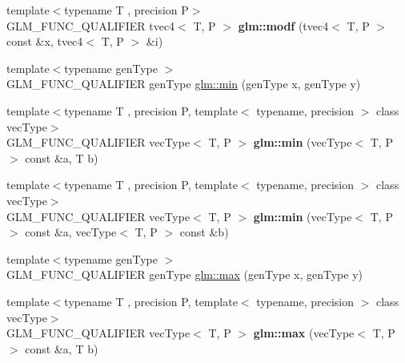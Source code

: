 \begin{DoxyCompactItemize}
\item 
\hypertarget{namespaceglm_ab562559172a505edca9444da652387dd}{{\footnotesize template$<$typename T , precision P$>$ }\\G\-L\-M\-\_\-\-F\-U\-N\-C\-\_\-\-Q\-U\-A\-L\-I\-F\-I\-E\-R tvec4$<$ T, P $>$ {\bfseries glm\-::modf} (tvec4$<$ T, P $>$ const \&x, tvec4$<$ T, P $>$ \&i)}\label{namespaceglm_ab562559172a505edca9444da652387dd}

\item 
{\footnotesize template$<$typename gen\-Type $>$ }\\G\-L\-M\-\_\-\-F\-U\-N\-C\-\_\-\-Q\-U\-A\-L\-I\-F\-I\-E\-R gen\-Type \hyperlink{group__core__func__common_ga2c2bde1cec025b7ddff83c74a1113719}{glm\-::min} (gen\-Type x, gen\-Type y)
\item 
\hypertarget{group__core__func__common_ga33e66cacf3e991ef1f7d0fce6d073ff9}{{\footnotesize template$<$typename T , precision P, template$<$ typename, precision $>$ class vec\-Type$>$ }\\G\-L\-M\-\_\-\-F\-U\-N\-C\-\_\-\-Q\-U\-A\-L\-I\-F\-I\-E\-R vec\-Type$<$ T, P $>$ {\bfseries glm\-::min} (vec\-Type$<$ T, P $>$ const \&a, T b)}\label{group__core__func__common_ga33e66cacf3e991ef1f7d0fce6d073ff9}

\item 
\hypertarget{group__core__func__common_ga502b20a691e374cf42dea6e3d126d476}{{\footnotesize template$<$typename T , precision P, template$<$ typename, precision $>$ class vec\-Type$>$ }\\G\-L\-M\-\_\-\-F\-U\-N\-C\-\_\-\-Q\-U\-A\-L\-I\-F\-I\-E\-R vec\-Type$<$ T, P $>$ {\bfseries glm\-::min} (vec\-Type$<$ T, P $>$ const \&a, vec\-Type$<$ T, P $>$ const \&b)}\label{group__core__func__common_ga502b20a691e374cf42dea6e3d126d476}

\item 
{\footnotesize template$<$typename gen\-Type $>$ }\\G\-L\-M\-\_\-\-F\-U\-N\-C\-\_\-\-Q\-U\-A\-L\-I\-F\-I\-E\-R gen\-Type \hyperlink{group__core__func__common_ga98caa7f95a94c86a86ebce893a45326c}{glm\-::max} (gen\-Type x, gen\-Type y)
\item 
\hypertarget{group__core__func__common_ga1a31d3f13a4bd0aa9828e263b7ac5896}{{\footnotesize template$<$typename T , precision P, template$<$ typename, precision $>$ class vec\-Type$>$ }\\G\-L\-M\-\_\-\-F\-U\-N\-C\-\_\-\-Q\-U\-A\-L\-I\-F\-I\-E\-R vec\-Type$<$ T, P $>$ {\bfseries glm\-::max} (vec\-Type$<$ T, P $>$ const \&a, T b)}\label{group__core__func__common_ga1a31d3f13a4bd0aa9828e263b7ac5896}


\end{DoxyCompactItemize}
